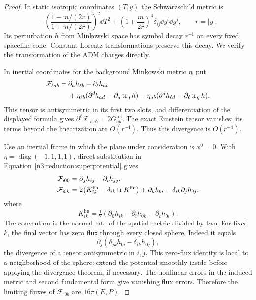 \begin{proof}
In static isotropic coordinates $(T,y)$ the Schwarzschild metric is
\begin{equation}
 \label{n3:reduction:schwarzschild-spacetime}
 -\left(\frac{1-m/(2r)}{1+m/(2r)}\right)^2\dd T^2
       +\left(1+\frac{m}{2r}\right)^4\delta_{ij}\dd y^i\dd y^j,
 \qquad r=|y|.
\end{equation}
Its perturbation $h$ from Minkowski space has symbol decay $r^{-1}$
on every fixed spacelike cone.  Constant Lorentz transformations preserve
this decay.  We verify the transformation of the ADM charges directly.

In inertial coordinates for the background Minkowski metric $\eta$, put
\begin{align}
 \mathcal F_{\ell ab}
  ={}&\partial_a h_{\ell b}-\partial_\ell h_{ab}\notag\\
   &+\eta_{\ell b}
       (\partial^d h_{ad}-\partial_a\operatorname{tr}_\eta h)
    -\eta_{ab}
       (\partial^d h_{\ell d}-\partial_\ell\operatorname{tr}_\eta h).
       \label{n3:reduction:superpotential}
\end{align}
This tensor is antisymmetric in its first two slots, and differentiation
of the displayed formula gives
$\partial^\ell\mathcal F_{\ell ab}=2G^{\mathrm{lin}}_{ab}$.
The exact Einstein tensor vanishes; its terms beyond the linearization
are $O(r^{-4})$.  Thus this divergence is $O(r^{-4})$.

Use an inertial frame in which the plane under consideration is
$x^0=0$.  With $\eta=\operatorname{diag}(-1,1,1,1)$, direct substitution
in Equation~\eqref{n3:reduction:superpotential} gives
\begin{align*}
 \mathcal F_{i00}&=\partial_jh_{ij}-\partial_ih_{jj},\\
 \mathcal F_{i0k}
  &=2\bigl(K^{\mathrm{lin}}_{ik}
          -\delta_{ik}\operatorname{tr} K^{\mathrm{lin}}\bigr)
       +\partial_kh_{0i}-\delta_{ik}\partial_jh_{0j},
\end{align*}
where
\[
 K^{\mathrm{lin}}_{ik}
 =\tfrac12(\partial_0h_{ik}-\partial_ih_{0k}-\partial_kh_{0i}).
\]
The convention is the normal rate of the spatial metric divided by two.
For fixed $k$, the final vector has zero flux through every closed sphere.
Indeed it equals
\[
 \partial_j(\delta_{jk}h_{0i}-\delta_{ik}h_{0j}),
\]
the divergence of a tensor antisymmetric in $i,j$.  This zero-flux
identity is local to a neighborhood of the sphere: extend the potential
smoothly inside before applying the divergence theorem, if necessary.
The nonlinear errors in the induced metric and second fundamental form
give vanishing flux errors.  Therefore the limiting fluxes of
$\mathcal F_{i0b}$ are $16\pi(E,P)$.


\end{proof}

